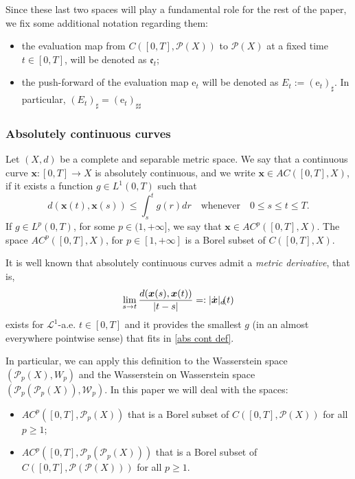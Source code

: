 \documentclass[10pt,leqno]{amsart}
\numberwithin{equation}{section}
\newcommand{\PP}{\mathcal{P}}
\newcommand{\e}{\mathrm{e}}
\begin{document}
Since these last two spaces will play a fundamental role for the rest of the paper, we fix some additional notation regarding them:
\begin{itemize}
    \item the evaluation map from $C([0,T],\PP(X))$ to $\PP(X)$ at a fixed time $t\in [0,T]$, will be denoted as $\mathfrak{e}_t$;
    \item the push-forward of the evaluation map $\e_t$ will be denoted as $E_t:= (\e_t)_{\sharp}$. In particular, $(E_t)_\sharp = (\e_t)_{\sharp\sharp}$
\end{itemize}

\subsubsection{Absolutely continuous curves} Let $(X,d)$ be a complete and separable metric space. We say that a continuous curve $\boldsymbol{x}:[0,T] \to X$ is absolutely continuous, and we write $\boldsymbol{x}\in 
   AC([0,T],X)$, if it exists a function $g\in L^1(0,T)$ such that 
   \begin{equation}\label{abs cont def}
        d(\boldsymbol{x}(t),\boldsymbol{x}(s)) \leq \int_s^t g(r) dr \quad \text{whenever}\quad 0\leq s \leq t \leq T.
   \end{equation}
   If $g\in L^p(0,T)$, for some $p\in (1,+\infty]$, we say that $\boldsymbol{x}\in 
   AC^p([0,T],X)$. The space $AC^p([0,T],X)$, for $p\in[1,+\infty]$ is a Borel subset of $C([0,T],X)$.

It is well known \cite{ambrosio2005gradient} that absolutely continuous curves admit a \textit{metric derivative}, that is,
\begin{equation}
        \lim_{s\to t} \frac{d(
        \boldsymbol{x}(s),
        \boldsymbol{x}(t))}{|t-s|} =:|\dot{\boldsymbol{x}}|_{d}
        \kern-2pt(t)
    \end{equation}
    exists for $\mathcal{L}^1$-a.e. $t\in [0,T]$ 
    and it 
    provides the smallest $g$ (in an almost everywhere pointwise sense) that fits in \eqref{abs cont def}. 

    In particular, we can apply this definition to the Wasserstein space $(\PP_p(X),W_p)$ and the Wasserstein on Wasserstein space $(\PP_p(\PP_p(X)),\mathcal{W}_p)$. In this paper we will deal with the spaces:
    \begin{itemize}
        \item $AC^p([0,T],\PP_p(X))$ that is a Borel subset of $C([0,
        T],\PP(X))$ for all $p\geq 1$;
        \item $AC^p([0,T],\PP_p(\PP_p(X)))$ that is a Borel subset of $C([0,
        T],\PP(\PP(X)))$ for all $p\geq 1$.
    \end{itemize}
\end{document}
